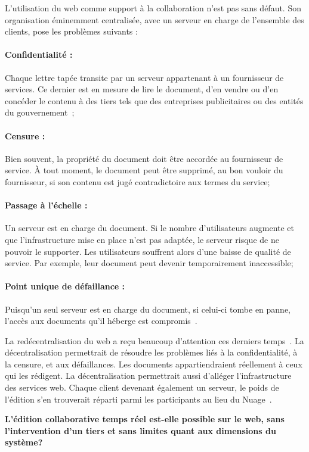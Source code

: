 L'utilisation du web comme support à la collaboration n'est pas sans défaut. Son
organisation éminemment centralisée, avec un serveur en charge de l'ensemble des
clients, pose les problèmes suivants :

\paragraph{Confidentialité :} Chaque lettre tapée transite par un serveur
appartenant à un fournisseur de services. Ce dernier est en mesure de lire le
document, d'en vendre ou d'en concéder le contenu à des tiers tels que des
entreprises publicitaires ou des entités du
gouvernement~\cite{cherrueau2016composer, gellman2013us, pearson2011toward};

\paragraph{Censure :} Bien souvent, la propriété du document doit être accordée
au fournisseur de service. À tout moment, le document peut être supprimé, au bon
vouloir du fournisseur, si son contenu est jugé contradictoire aux termes du
service;

\paragraph{Passage à l'échelle :} Un serveur est en charge du document. Si le
nombre d'utilisateurs augmente et que l'infrastructure mise en place n'est pas
adaptée, le serveur risque de ne pouvoir le supporter. Les utilisateurs
souffrent alors d'une baisse de qualité de service. Par exemple, leur document
peut devenir temporairement inaccessible;

\paragraph{Point unique de défaillance :} Puisqu'un seul serveur est en charge
du document, si celui-ci tombe en panne, l'accès aux documents qu'il héberge est
compromis~\cite{demers1987epidemic}.
  
La redécentralisation du web a reçu beaucoup d'attention ces derniers
temps~\cite{mansour2016demonstration, wood2014ethereum}. La décentralisation
permettrait de résoudre les problèmes liés à la confidentialité, à la censure,
et aux défaillances. Les documents appartiendraient réellement à ceux qui les
rédigent. La décentralisation permettrait aussi d'alléger l'infrastructure des
services web. Chaque client devenant également un serveur, le poids de l'édition
s'en trouverait réparti parmi les participants au lieu du
Nuage~\cite{mell2011national}.


\textbf{L'édition collaborative temps réel est-elle possible sur le web, sans
  l'intervention d'un tiers et sans limites quant aux dimensions du système?}

